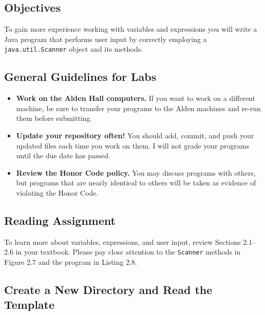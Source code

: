 


\vspace{-0.275in}
\subsection*{Objectives}

To gain more experience working with variables and expressions you will write a Java program that performs user input by
correctly employing a {\tt java.util.Scanner} object and its methods.

\vspace{-0.15in}
\subsection*{General Guidelines for Labs}
\begin{itemize}
\itemsep -.25pt
\item
{\bf Work on the Alden Hall computers.} If you want to work on a different
machine, be sure to transfer your programs to the Alden
machines and re-run them before submitting.
\item
{\bf Update your repository often!} You should add, commit,
and push your updated files each time you work on them.  I will not grade
your programs until the due date has passed.
\item
{\bf Review the Honor Code policy.} You
may discuss programs with others, but programs that are nearly identical
to others will be taken as evidence of violating the Honor Code.
\end{itemize}

\vspace{-0.25in}
\subsection*{Reading Assignment}

To learn more about variables, expressions, and user input, review Sections 2.1--2.6 in your textbook. Please pay
close attention to the {\tt Scanner} methods in Figure 2.7 and the program in Listing 2.8.

\vspace{-0.15in}
\subsection*{Create a New Directory and Read the Template}

